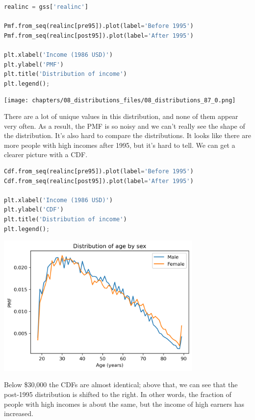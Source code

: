 \begin{lstlisting}[language=Python,style=source]
realinc = gss['realinc']

Pmf.from_seq(realinc[pre95]).plot(label='Before 1995')
Pmf.from_seq(realinc[post95]).plot(label='After 1995')

plt.xlabel('Income (1986 USD)')
plt.ylabel('PMF')
plt.title('Distribution of income')
plt.legend();
\end{lstlisting}

\begin{center}
\texttt{[image: chapters/08\_distributions\_files/08\_distributions\_87\_0.png]}
\end{center}

There are a lot of unique values in this distribution, and none of them
appear very often. As a result, the PMF is so noisy and we can't really
see the shape of the distribution. It's also hard to compare the
distributions. It looks like there are more people with high incomes
after 1995, but it's hard to tell. We can get a clearer picture with a
CDF.

\begin{lstlisting}[language=Python,style=source]
Cdf.from_seq(realinc[pre95]).plot(label='Before 1995')
Cdf.from_seq(realinc[post95]).plot(label='After 1995')

plt.xlabel('Income (1986 USD)')
plt.ylabel('CDF')
plt.title('Distribution of income')
plt.legend();
\end{lstlisting}

\begin{center}
\includegraphics[width=4in]{chapters/08_distributions_files/08_distributions_89_0.png}
\end{center}

Below \$30,000 the CDFs are almost identical; above that, we can see
that the post-1995 distribution is shifted to the right. In other words,
the fraction of people with high incomes is about the same, but the
income of high earners has increased.

